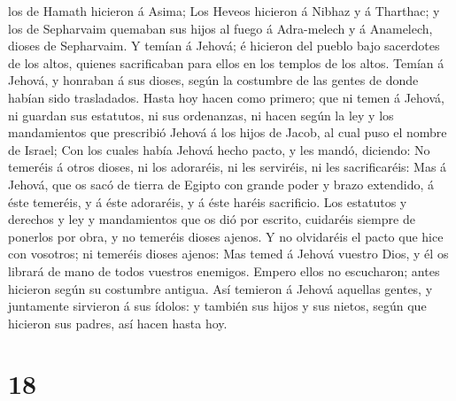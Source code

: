 los de Hamath hicieron á Asima;  Los Heveos hicieron á
Nibhaz y á Tharthac; y los de Sepharvaim quemaban sus hijos al fuego á
Adra-melech y á Anamelech, dioses de Sepharvaim.  Y
temían á Jehová; é hicieron del pueblo bajo sacerdotes de los altos,
quienes sacrificaban para ellos en los templos de los altos.
 Temían á Jehová, y honraban á sus dioses, según la
costumbre de las gentes de donde habían sido trasladados.
 Hasta hoy hacen como primero; que ni temen á Jehová, ni
guardan sus estatutos, ni sus ordenanzas, ni hacen según la ley y los
mandamientos que prescribió Jehová á los hijos de Jacob, al cual puso el
nombre de Israel;  Con los cuales había Jehová hecho
pacto, y les mandó, diciendo: No temeréis á otros dioses, ni los
adoraréis, ni les serviréis, ni les sacrificaréis:  Mas á
Jehová, que os sacó de tierra de Egipto con grande poder y brazo
extendido, á éste temeréis, y á éste adoraréis, y á éste haréis
sacrificio.  Los estatutos y derechos y ley y
mandamientos que os dió por escrito, cuidaréis siempre de ponerlos por
obra, y no temeréis dioses ajenos.  Y no olvidaréis el
pacto que hice con vosotros; ni temeréis dioses ajenos: 
Mas temed á Jehová vuestro Dios, y él os librará de mano de todos
vuestros enemigos.  Empero ellos no escucharon; antes
hicieron según su costumbre antigua.  Así temieron á
Jehová aquellas gentes, y juntamente sirvieron á sus ídolos: y también
sus hijos y sus nietos, según que hicieron sus padres, así hacen hasta
hoy.

\hypertarget{section-17}{%
\section{18}\label{section-17}}

